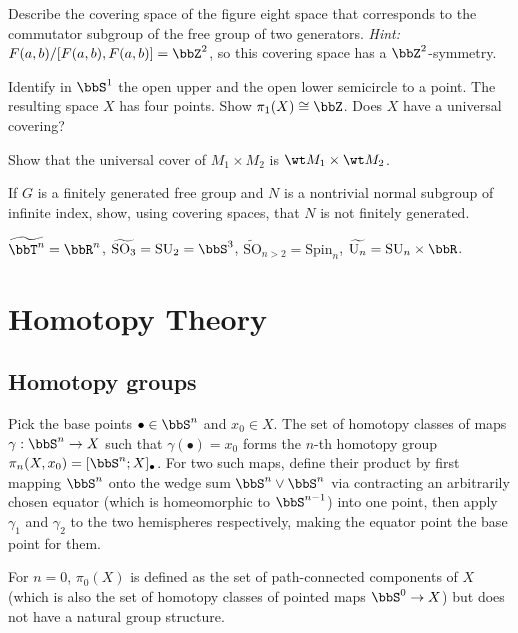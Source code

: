 \begin{xca}
    Describe the covering space of the figure eight space that corresponds to the commutator subgroup of the free group of two generators. \emph{Hint:} $F(a,b)\slash [F(a,b),F(a,b)]=\bbZ^2$, so this covering space has a $\bbZ^2$-symmetry.
\end{xca}
\begin{xca}
    Identify in $\bbS^1$ the open upper and the open lower semicircle to a point. The resulting space $X$ has four points. Show $\pi_1(X)\cong \bbZ$. Does $X$ have a universal covering?
\end{xca}
\begin{xca}
    Show that the universal cover of $M_1\times M_2$ is $\wt M_1\times \wt M_2$.
\end{xca}
\begin{xca}
    If $G$ is a finitely generated free group and $N$ is a nontrivial normal subgroup of infinite index, show, using covering spaces, that $N$ is not finitely generated.
\end{xca}

\begin{example}
    $\widetilde{\bbT^n}=\bbR^n$, $\widetilde{\text{SO}_3}=\text{SU}_2=\bbS^3$, $\widetilde{\text{SO}}_{n>2}=\text{Spin}_n$, $\widetilde{\text{U}_n}=\text{SU}_n\times \bbR $.
\end{example}











\clearpage
\chapter{Homotopy Theory}\label{ch homotopy theory}

\section{Homotopy groups}

\begin{defn}
Pick the base points $\bullet\in \bbS^n$ and $x_0\in X$. The set of homotopy classes of maps $\gamma:\bbS^n\to X$ such that $\gamma(\bullet)=x_0$ forms the $n$-th homotopy group $\pi_n(X,x_0)=[\bbS^n;X]_\bullet$. For two such maps, define their product by first mapping $\bbS^n$ onto the wedge sum $\bbS^n\lor \bbS^n$ via contracting an arbitrarily chosen equator (which is homeomorphic to $\bbS^{n-1}$) into one point, then apply $\gamma_1$ and $\gamma_2$ to the two hemispheres respectively, making the equator point the base point for them.

For $n=0$, $\pi_0(X)$ is defined as the set of path-connected components of $X$ (which is also the set of homotopy classes of pointed maps $\bbS^0\to X$) but does not have a natural group structure.
\end{defn}

